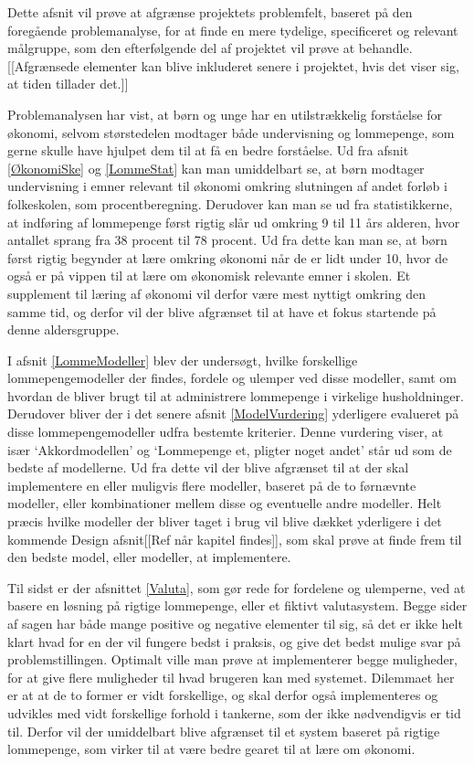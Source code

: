 Dette afsnit vil prøve at afgrænse projektets problemfelt, baseret på den foregående problemanalyse, for at finde en mere tydelige, specificeret og relevant målgruppe, som den efterfølgende del af projektet vil prøve at behandle. [[Afgrænsede elementer kan blive inkluderet senere i projektet, hvis det viser sig, at tiden tillader det.]]

Problemanalysen har vist, at børn og unge har en utilstrækkelig forståelse for økonomi, selvom størstedelen modtager både undervisning og lommepenge, som gerne skulle have hjulpet dem til at få en bedre forståelse. Ud fra afsnit \ref{ØkonomiSke} og \ref{LommeStat}  kan man umiddelbart se, at børn modtager undervisning i emner relevant til økonomi omkring slutningen af andet forløb i folkeskolen, som procentberegning. Derudover kan man se ud fra statistikkerne, at indføring af lommepenge først rigtig slår ud omkring 9 til 11 års alderen, hvor antallet sprang fra 38 procent til 78 procent. Ud fra dette kan man se, at børn først rigtig begynder at lære omkring økonomi når de er lidt under 10, hvor de også er på vippen til at lære om økonomisk relevante emner i skolen. Et supplement til læring af økonomi vil derfor være mest nyttigt omkring den samme tid, og derfor vil der blive afgrænset til at have et fokus startende på denne aldersgruppe.

I afsnit \ref{LommeModeller} blev der undersøgt, hvilke forskellige lommepengemodeller der findes, fordele og ulemper ved disse modeller, samt om hvordan de bliver brugt til at administrere lommepenge i virkelige husholdninger. Derudover bliver der i det senere afsnit \ref{ModelVurdering} yderligere evalueret på disse lommepengemodeller udfra bestemte kriterier. Denne vurdering viser, at især ‘Akkordmodellen’ og ‘Lommepenge et, pligter noget andet’ står ud som de bedste af modellerne. Ud fra dette vil der blive afgrænset til at der skal implementere en eller muligvis flere modeller, baseret på de to førnævnte modeller, eller kombinationer mellem disse og eventuelle andre modeller. Helt præcis hvilke modeller der bliver taget i brug vil blive dækket yderligere i det kommende Design afsnit[[Ref når kapitel findes]], som skal prøve at finde frem til den bedste model, eller modeller, at implementere.

Til sidst er der afsnittet \ref{Valuta}, som gør rede for fordelene og ulemperne, ved at basere en løsning på rigtige lommepenge, eller et fiktivt valutasystem. Begge sider af sagen har både mange positive og negative elementer til sig, så det er ikke helt klart hvad for en der vil fungere bedst i praksis, og give det bedst mulige svar på problemstillingen. Optimalt ville man prøve at implementerer begge muligheder, for at give flere muligheder til hvad brugeren kan med systemet. Dilemmaet her er at at de to former er vidt forskellige, og skal derfor også implementeres og udvikles med vidt forskellige forhold i tankerne, som der ikke nødvendigvis er tid til. Derfor vil der umiddelbart blive afgrænset til et system baseret på rigtige lommepenge, som virker til at være bedre gearet til at lære om økonomi.